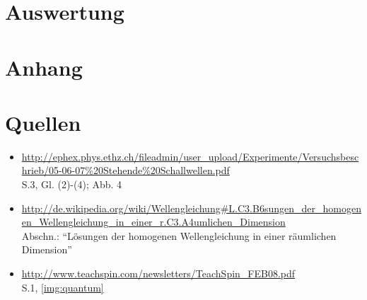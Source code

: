 \documentclass[numbers=noenddot,12pt,a4paper]{scrartcl}
\begin{document}
\fancyfoot[L]{\textit{}}
\newpage
\fancyfoot[L]{}

\section{Auswertung}


\fancyfoot[L]{\textit{}}
\newpage
\fancyfoot[L]{}

\section{Anhang}
\section{Quellen}
\begin{itemize}
	\item{\url{http://ephex.phys.ethz.ch/fileadmin/user_upload/Experimente/Versuchsbeschrieb/05-06-07%20Stehende%20Schallwellen.pdf}\\ S.3, Gl. (2)-(4); Abb. 4}
	\item{\url{http://de.wikipedia.org/wiki/Wellengleichung#L.C3.B6sungen_der_homogenen_Wellengleichung_in_einer_r.C3.A4umlichen_Dimension}\\ Abschn.: "`Lösungen der homogenen Wellengleichung in einer räumlichen Dimension"'}
	\item{\url{http://www.teachspin.com/newsletters/TeachSpin_FEB08.pdf}\\ S.1, \ref{img:quantum}}
\end{itemize}
\end{document}
